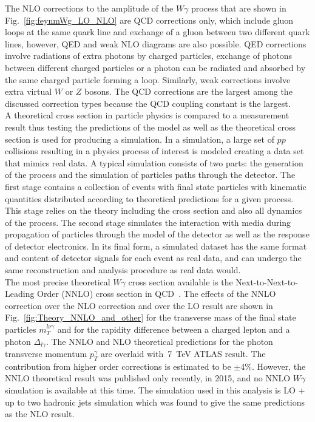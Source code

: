 The NLO corrections to the amplitude of the $W\gamma$ process that are shown in Fig.~\ref{fig:feynmWg_LO_NLO} are QCD corrections only, which include gluon loops at the same quark line and exchange of a gluon between two different quark lines, however, QED and weak NLO diagrams are also possible. QED corrections involve radiations of extra photons by charged particles, exchange of photons between different charged particles or a photon can be radiated and absorbed by the same charged particle forming a loop. Similarly, weak corrections involve extra virtual $W$ or $Z$ bosons. The QCD corrections are the largest among the discussed correction types because the QCD coupling constant is the largest.\\

A theoretical cross section in particle physics is compared to a measurement result thus testing the predictions of the model as well as the theoretical cross section is used for producing a simulation. In a simulation, a large set of $pp$ collisions resulting in a physics process of interest is modeled creating a data set that mimics real data. A typical simulation consists of two parts: the generation of the process and the simulation of particles paths through the detector. The first stage contains a collection of events with final state particles with kinematic quantities distributed according to theoretical predictions for a given process. This stage relies on the theory including the cross section and also all dynamics of the process. The second stage simulates the interaction with media during propagation of particles through the model of the detector as well as the response of detector electronics. In its final form, a simulated dataset has the same format and content of detector signals for each event as real data, and can undergo the same reconstruction and analysis procedure as real data would.\\

The most precise theoretical $W\gamma$ cross section available is the Next-to-Next-to-Leading Order (NNLO) cross section in QCD~\cite{ref_theory_NNLO}. The effects of the NNLO correction over the NLO correction and over the LO result are shown in Fig.~\ref{fig:Theory_NNLO_and_other} for the transverse mass of the final state particles $m_T^{l \nu \gamma}$ and for the rapidity difference between a charged lepton and a photon $\Delta_{l\gamma}$. The NNLO and NLO theoretical predictions for the photon transverse momentum $p_T^\gamma$ are overlaid with~7~TeV ATLAS result. The contribution from higher order corrections is estimated to be $\pm$4\%. However, the NNLO theoretical result was published only recently, in 2015, and no NNLO $W\gamma$ simulation is available at this time. The simulation used in this analysis is LO + up to two hadronic jets simulation which was found to give the same predictions as the NLO result.\\

